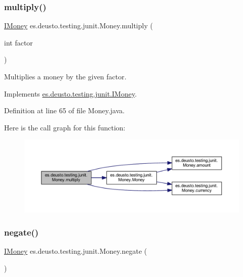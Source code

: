 \subsubsection{\texorpdfstring{multiply()}{multiply()}}
{\footnotesize\ttfamily \mbox{\hyperlink{interfacees_1_1deusto_1_1testing_1_1junit_1_1_i_money}{I\+Money}} es.\+deusto.\+testing.\+junit.\+Money.\+multiply (\begin{DoxyParamCaption}\item[{int}]{factor }\end{DoxyParamCaption})}

Multiplies a money by the given factor. 

Implements \mbox{\hyperlink{interfacees_1_1deusto_1_1testing_1_1junit_1_1_i_money_a09154f9713133d4734f72d6a20081209}{es.\+deusto.\+testing.\+junit.\+I\+Money}}.



Definition at line 65 of file Money.\+java.

Here is the call graph for this function\+:
\nopagebreak
\begin{figure}[H]
\begin{center}
\leavevmode
\includegraphics[width=350pt]{classes_1_1deusto_1_1testing_1_1junit_1_1_money_a02c7d4e9013710f70d1d46e9c9ebae88_cgraph}
\end{center}
\end{figure}
\mbox{\label{classes_1_1deusto_1_1testing_1_1junit_1_1_money_ae5f0bc3ea87f1fd55d6478653b8f2e36}} 
\subsubsection{\texorpdfstring{negate()}{negate()}}
{\footnotesize\ttfamily \mbox{\hyperlink{interfacees_1_1deusto_1_1testing_1_1junit_1_1_i_money}{I\+Money}} es.\+deusto.\+testing.\+junit.\+Money.\+negate (\begin{DoxyParamCaption}{ }\end{DoxyParamCaption})}

